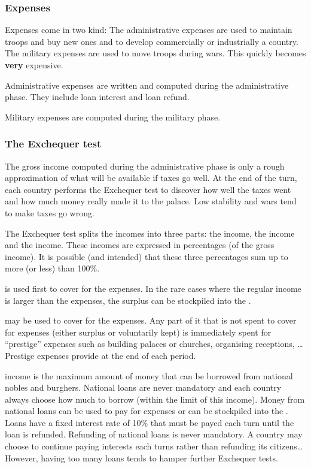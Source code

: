 \subsubsection{Expenses}
\aparag Expenses come in two kind:
\bparag The administrative expenses are used to maintain troops and buy new
ones and to develop commercially or industrially a country.
\bparag The military expenses are used to move troops during wars. This
quickly becomes \textbf{very} expensive.

\aparag Administrative expenses are written and computed during the
administrative phase.
\bparag They include loan interest and loan refund.

\aparag Military expenses are computed during the military phase.


\subsubsection{The Exchequer test}
\aparag The gross income computed during the administrative phase is only a
rough approximation of what will be available if taxes go well.
\bparag At the end of the turn, each country performs the Exchequer test to
discover how well the taxes went and how much money really made it to the
palace.
\bparag Low stability and wars tend to make taxes go wrong.

\aparag The Exchequer test splits the incomes into three parts: the
 income, the  income and the  income.
\bparag These incomes are expressed in percentages (of the gross income).
\bparag It is possible (and intended) that these three percentages sum up to
more (or less) than 100\%.

 is used first to cover for the expenses.
\bparag In the rare cases where the regular income is larger than the
expenses, the surplus can be stockpiled into the \RT.

 may be used to cover for the expenses.
\bparag Any part of it that is not spent to cover for expenses (either surplus
or voluntarily kept) is immediately spent for ``prestige'' expenses such as
building palaces or churches, organising receptions, \ldots
\bparag Prestige expenses provide \VPs at the end of each period.

 income is the maximum amount of money that can be
borrowed from national nobles and burghers.
\bparag National loans are never mandatory and each country always choose how
much to borrow (within the limit of this income).
\bparag Money from national loans can be used to pay for expenses or can be
stockpiled into the \RT.
\bparag Loans have a fixed interest rate of 10\% that must be payed each turn
until the loan is refunded.
\bparag Refunding of national loans is never mandatory. A country may choose
to continue paying interests each turns rather than refunding its
citizens\ldots
\bparag However, having too many loans tends to hamper further Exchequer
tests.

